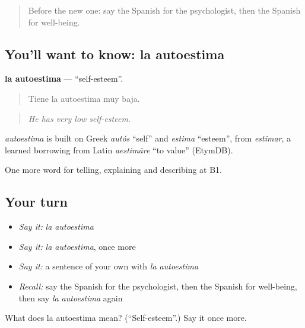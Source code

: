 \label{lesson:ES-C743-autoestima}



\begin{quote}
Before the new one: say the Spanish for the psychologist, then the Spanish for well-being.
\end{quote}

\subsection*{You'll want to know: la autoestima}
\textbf{la autoestima} — \textquotedblleft{}self-esteem\textquotedblright{}.

\begin{quote}
Tiene la autoestima muy baja.
\end{quote}

\begin{quote}
\emph{He has very low self-esteem.}
\end{quote}

\begin{cousinweb}
\emph{autoestima} is built on Greek \emph{autós} \textquotedblleft{}self\textquotedblright{} and \emph{estima} \textquotedblleft{}esteem\textquotedblright{}, from \emph{estimar}, a learned borrowing from Latin \emph{aestimāre} \textquotedblleft{}to value\textquotedblright{} (EtymDB).
\end{cousinweb}

\begin{grammarlens}[title={What you've built}]
One more word for telling, explaining and describing at B1.
\end{grammarlens}

\subsection*{Your turn}
\begin{itemize}
\raggedright
  \item \emph{Say it:} \emph{la autoestima}
  \item \emph{Say it:} \emph{la autoestima}, once more
  \item \emph{Say it:} a sentence of your own with \emph{la autoestima}
  \item \emph{Recall:} say the Spanish for the psychologist, then the Spanish for well-being, then say \emph{la autoestima} again
\end{itemize}

\begin{tcolorbox}[breakable,colback=teal!4,colframe=teal!35!black,title={Before you move on}]
What does la autoestima mean? (\textquotedblleft{}Self-esteem\textquotedblright{}.) Say it once more.
\end{tcolorbox}
